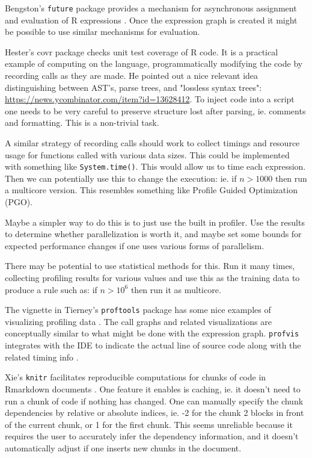 \documentclass[12pt]{article}
\begin{document}
Bengston's \texttt{future} package provides a mechanism for
asynchronous assignment and evaluation of R expressions \cite{R-future}. Once the
expression graph is created it might be possible to use similar mechanisms
for evaluation.

Hester's covr package \cite{R-covr} checks unit test coverage of R
code. It is a practical example of computing on the language,
programmatically modifying the code by recording calls as they are made.
He pointed out a nice relevant idea distinguishing between AST's, parse
trees, and "lossless syntax trees":
\url{https://news.ycombinator.com/item?id=13628412}. To inject code into a
script one needs to be very
careful to preserve structure lost after parsing, ie.
comments and formatting. This is a non-trivial task.

A similar strategy of recording calls should work to collect timings and
resource usage for functions called with various data sizes. This could be
implemented with something like \texttt{System.time()}. This would allow us
to time each expression. Then we can potentially use this to change the
execution: ie. if $n > 1000$ then run a multicore version. This resembles
something like Profile Guided Optimization (PGO). 

Maybe a simpler way to do this is to just use the built in profiler. Use
the results to determine whether parallelization is worth it, and maybe set
some bounds for expected performance changes if one uses various forms of
parallelism. 

There may be potential to use statistical methods for this.
Run it many times, collecting profiling results for various values and use
this as the training data to produce a rule such as: if $n > 10^6$ then run
it as multicore.

The vignette in Tierney's \texttt{proftools} package has some nice examples
of visualizing profiling data \cite{R-proftools}. The call graphs and
related visualizations are conceptually similar to what might be done with
the expression graph.  \texttt{profvis} integrates with the IDE to indicate
the actual line of source code along with the related timing info
\cite{R-profvis}.

Xie's \texttt{knitr} facilitates reproducible computations for
chunks of code in Rmarkdown documents \cite{R-knitr}. One feature it enables is caching,
ie. it doesn't need to run a chunk of code if nothing has changed. One can
manually specify the chunk dependencies by relative or absolute indices,
ie. -2 for the chunk 2 blocks in front of the current chunk, or 1 for the
first chunk. This seems unreliable because it requires the user to
accurately infer the dependency information, and it doesn't automatically
adjust if one inserts new chunks in the document.
\end{document}
